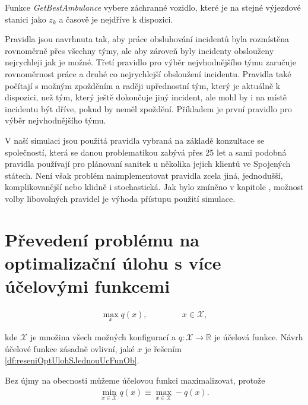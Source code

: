 \begin{definice}[GetBestTeam]
Funkce \textit{GetBestAmbulance}\label{df:getBestAmbulance} vybere záchranné vozidlo, které je na stejné výjezdové stanici jako $z_k$ a časově je nejdříve k dispozici.
\end{definice}

Pravidla jsou navrhnuta tak, aby práce obsluhování incidentů byla rozmístěna rovnoměrně přes všechny týmy, ale aby zároveň byly incidenty obslouženy nejrychleji jak je možné.
Třetí pravidlo pro výběr nejvhodnějšího týmu zaručuje rovnoměrnost práce a druhé co nejrychlejší obsloužení incidentu.
Pravidla také počítají s možným zpožděním a raději upřednostní tým, který je aktuálně k dispozici, než tým, který ještě dokončuje jiný incident, ale mohl by i na místě incidentu
být dříve, pokud by neměl zpoždění. Příkladem je první pravidlo pro výběr nejvhodnějšího týmu.

V naší simulaci jsou použitá pravidla vybraná na základě konzultace se společností, která se danou problematikou zabývá přes 25 let a sami podobná pravidla používají pro plánovaní sanitek
u několika jejich klientů ve Spojených státech.
Není však problém naimplementovat pravidla zcela jiná, jednodušší, komplikovanější nebo klidně i stochastická.
Jak bylo zmíněno v kapitole \label{kap:procSimulace}, možnost volby libovolných pravidel je výhoda přístupu použití simulace.

\section{Převedení problému na optimalizační úlohu s více účelovými funkcemi}\label{kap:optUloha2uc}

\begin{definice}\label{df:optUloha1ucObecne}
  \begin{align*}
    \max_{x} q(x), \hspace{50pt} x \in \mathcal{X},
  \end{align*}

  kde $\mathcal{X}$ je množina všech možných konfigurací a $q \colon \mathcal{X} \rightarrow \mathbb{R}$ je účelová funkce.
  Návrh účelové funkce zásadně ovlivní, jaké $x$ je řešením \ref{df:reseniOptUlohSJednouUcFunOb}.

  Bez újmy na obecnosti můžeme účelovou funkci maximalizovat, protože
  \begin{align*}
    \min_{x \in \mathcal{X}} q(x) \equiv \max_{x \in \mathcal{X}} -q(x).
  \end{align*}
\end{definice}

